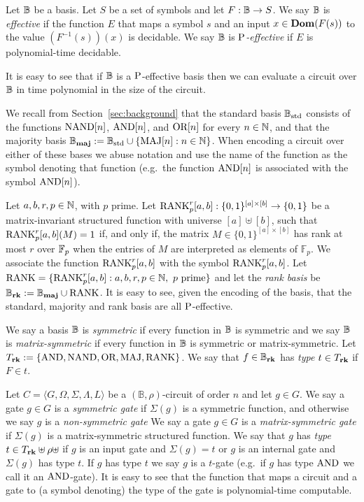 \documentclass[../paper.tex]{subfiles}
\begin{document}
\begin{definition}
  Let $\mathbb{B}$ be a basis. Let $S$ be a set of symbols and let $F : \mathbb{B} \rightarrow
  S$. We say $\mathbb{B}$ is \emph{effective} if the function $E$ that maps a symbol
  $s$ and an input $x \in \text{\textbf{Dom}}(F(s))$ to the value $(F^{-1}(s))(x)$ is
  decidable. We say $\mathbb{B}$ is \emph{$\mathrm{P}$-effective} if $E$ is polynomial-time
  decidable.
\end{definition}

It is easy to see that if $\mathbb{B}$ is a $\mathrm{P}$-effective basis then we can evaluate
a circuit over $\mathbb{B}$ in time polynomial in the size of the circuit.

We recall from Section~\ref{sec:background} that the standard basis $\mathbb{B}_{\text{std}}$
consists of the functions $\text{\upshape NAND}[n]$, $\text{\upshape AND}[n]$, and $\text{\upshape OR}[n]$ for every $n \in
\mathbb{N}$, and that the majority basis $\mathbb{B}_{\text{\textbf{maj}}} := \mathbb{B}_{\text{std}} \cup \{\text{\upshape MAJ}[n] : n \in \mathbb{N}\}$.
When encoding a circuit over either of these bases we abuse notation and use the
name of the function as the symbol denoting that function (e.g.\ the function
$\text{\upshape AND}[n]$ is associated with the symbol $\text{\upshape AND}[n]$).

Let $a, b, r, p \in \mathbb{N}$, with $p$ prime. Let $\text{\upshape RANK}^r_p[a,b] : \{0,1\}^{[a]
  \times [b]} \rightarrow \{0,1\}$ be a matrix-invariant structured function
with universe $[a] \uplus [b]$, such that $\text{\upshape RANK}^r_p[a,b](M) = 1$ if, and only
if, the matrix $M \in \{0,1\}^{[a] \times [b]}$ has rank at most $r$ over
$\mathbb{F}_p$ when the entries of $M$ are interpreted as elements of $\mathbb{F}_p$.
We associate the function $\text{\upshape RANK}^{r}_p[a,b]$ with the symbol $\text{\upshape RANK}^{r}_p[a,b]$.
Let $\text{\upshape RANK} = \{\text{\upshape RANK}^{r}_p[a,b] : a, b, r, p \in \mathbb{N}, \text{ $p$ prime}\}$ and
let the \emph{rank basis} be $\mathbb{B}_{\text{\textbf{rk}}} := \mathbb{B}_{\text{\textbf{maj}}} \cup \text{\upshape RANK}$. It is easy to see, given
the encoding of the basis, that the standard, majority and rank basis are all
$\mathrm{P}$-effective.

We say a basis $\mathbb{B}$ is \emph{symmetric} if every function in $\mathbb{B}$ is symmetric
and we say $\mathbb{B}$ is \emph{matrix-symmetric} if every function in $\mathbb{B}$ is
symmetric or matrix-symmetric. Let $T_{\text{\textbf{rk}}} := \{\text{\upshape AND}, \text{\upshape NAND}, \text{\upshape OR}, \text{\upshape MAJ},
\text{\upshape RANK}\}$. We say that $f \in \mathbb{B}_{\text{\textbf{rk}}}$ has \emph{type} $t \in T_{\text{\textbf{rk}}}$ if $F \in
t$.


Let $C = \langle G, \Omega, \Sigma, \Lambda, L \rangle$ be a $(\mathbb{B},
\rho)$-circuit of order $n$ and let $g \in G$. We say a gate $g \in G$ is a
\emph{symmetric gate} if $\Sigma(g)$ is a symmetric function, and otherwise we
say $g$ is a \emph{non-symmetric gate} We say a gate $g \in G$ is a
\emph{matrix-symmetric gate} if $\Sigma(g)$ is a matrix-symmetric structured
function. We say that $g$ has \emph{type} $t \in T_{\text{\textbf{rk}}} \uplus \rho \uplus$
if $g$ is an input gate and $\Sigma (g) = t$ or $g$ is an internal gate and
$\Sigma (g)$ has type $t$. If $g$ has type $t$ we say $g$ is a $t$-gate (e.g.\
if $g$ has type $\text{\upshape AND}$ we call it an $\text{\upshape AND}$-gate). It is easy to see that the
function that maps a circuit and a gate to (a symbol denoting) the type of the
gate is polynomial-time computable.
\end{document}
